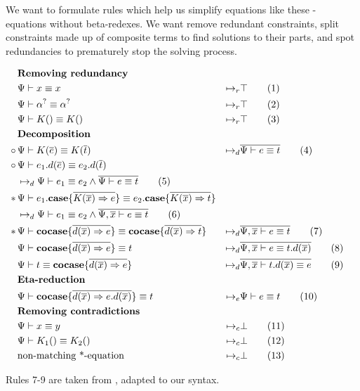 \documentclass[twoside,12pt,a4paper]{article}
\begin{document}
We want to formulate rules which help us simplify equations like these - equations without beta-redexes.
We want remove redundant constraints, split constraints made up of composite terms to find solutions to their parts,
and spot redundancies to prematurely stop the solving process.
\begin{definition}
    \begin{align*}
    &\textbf{Removing redundancy}\\
    &\Psi \vdash x\equiv x&\mapsto_r&\top
    \tag{1}\label{1}\\
    &\Psi \vdash \alpha^? \equiv \alpha^?&\mapsto_r& \top
    \tag{2}\\
    &\Psi \vdash K() \equiv K() &\mapsto_r& \top 
    \tag{3}\label{3}\\
    &\textbf{Decomposition}\\
    \circ\,&\Psi\vdash K(\overline{e})\equiv K(\overline{t})&
    \mapsto_d&\overline{\Psi\vdash e\equiv t}
    \tag{4}\label{4}\\
    \circ\,&\Psi \vdash e_1.d({\overline{e}})\equiv e_2.d({\overline{t}})
    \\ &\mapsto_d \Psi\vdash e_1 \equiv e_2 \wedge \overline{\Psi\vdash e\equiv t}
    \tag{5}\label{5}\\
    *\,&\Psi \vdash e_1.\textbf{case}\{\overline{K(\overline{x})\Rightarrow e}\}\equiv e_2.\textbf{case}\{\overline{K(\overline{x})\Rightarrow t}\}
    \\ &\mapsto_d \Psi \vdash e_1 \equiv e_2\wedge \overline{\Psi, \overline{x}\vdash e\equiv t}
    \tag{6}\\
    *\, &\Psi\vdash \textbf{cocase}\{\overline{d(\overline{x})\Rightarrow e}\}\equiv 
    \textbf{cocase}\{\overline{d(\overline{x})\Rightarrow t}\}
    &\mapsto_d& \overline{\Psi, \overline{x}\vdash e \equiv t}
    \tag{7}\label{7}\\
    &\Psi\vdash \textbf{cocase}\{\overline{d(\overline{x})\Rightarrow e}\}\equiv t 
    &\mapsto_d& \overline{\Psi,\overline{x} \vdash e \equiv t.d(\overline{x})}
    \tag{8}\label{8}\\ 
    &\Psi\vdash t\equiv \textbf{cocase}\{\overline{d(\overline{x})\Rightarrow e}\} 
    &\mapsto_d& \overline{\Psi, \overline{x}\vdash t.d(\overline{x}) \equiv e}
    \tag{9}\label{9}\\
    &\textbf{Eta-reduction}\\
    & \Psi \vdash \textbf{cocase}\{\overline{d(\overline{x})\Rightarrow e.d(\overline{x})}\}\equiv t
    &\mapsto_e&\Psi\vdash e\equiv t
    \tag{10}\\
    &\textbf{Removing contradictions}\\ 
    &\Psi \vdash x\equiv y &\mapsto_c& \bot 
    \tag{11}\\   
    &\Psi \vdash K_1() \equiv K_2() &\mapsto_c& \bot 
    \tag{12}\\
    &\text{non-matching *-equation}&\mapsto_c&\bot
    \tag{13}\label{13}\\
    \end{align*}
\end{definition}
Rules 7-9 are taken from \cite{10.5555/2021953.2021960}, adapted to our syntax. 
\end{document}
